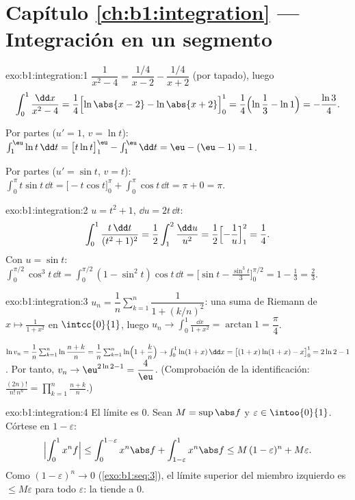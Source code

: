 \section*{Capítulo \ref{ch:b1:integration} --- Integración en un segmento}

\begin{solution}{exo:b1:integration:1}
$\dfrac{1}{x^2-4} = \dfrac{1/4}{x - 2} - \dfrac{1/4}{x+2}$
(por tapado), luego
\[
\int_0^1 \frac{\dd x}{x^2 - 4}
= \frac14\Bigl[\ln\abs{x-2} - \ln\abs{x+2}\Bigr]_0^1
= \frac14\Bigl(\ln\frac{1}{3} - \ln 1\Bigr) = -\frac{\ln 3}{4}.
\]

Por partes ($u' = 1$, $v = \ln t$): $\int_1^{\eu} \ln t\,\dd t =
\bigl[t\ln t\bigr]_1^{\eu} - \int_1^{\eu} \dd t = \eu - (\eu - 1) =
1$.

Por partes ($u' = \sin t$, $v = t$): $\int_0^\pi t\sin t\,\dd t =
\bigl[-t\cos t\bigr]_0^\pi + \int_0^\pi \cos t\,\dd t = \pi + 0 =
\pi$.
\end{solution}

\begin{solution}{exo:b1:integration:2}
 $u = t^2 + 1$, $\dd u = 2t\,\dd t$:
\[
\int_0^1 \frac{t\,\dd t}{(t^2+1)^2}
= \frac12 \int_1^2 \frac{\dd u}{u^2}
= \frac12\Bigl[-\frac1u\Bigr]_1^2 = \frac14 .
\]
Con $u = \sin t$: $\int_0^{\pi/2} \cos^3 t\,\dd t = \int_0^{\pi/2}
(1 - \sin^2 t)\cos t\,\dd t = \bigl[\sin t - \frac{\sin^3
t}{3}\bigr]_0^{\pi/2} = 1 - \frac13 = \frac23$.
\end{solution}

\begin{solution}{exo:b1:integration:3}
$u_n = \dfrac1n \sum_{k=1}^{n} \dfrac{1}{1 + (k/n)^2}$: una suma de
Riemann de $x \mapsto \frac{1}{1+x^2}$ en $\intcc{0}{1}$, luego
$u_n \to \int_0^1 \frac{\dd x}{1+x^2} = \arctan 1 = \dfrac\pi4$.

$\ln v_n = \dfrac1n \sum_{k=1}^{n} \ln\dfrac{n+k}{n} = \dfrac 1n
\sum_{k=1}^n \ln\Bigl(1 + \dfrac kn\Bigr) \to \int_0^1 \ln(1+x)\,\dd
x = \bigl[(1+x)\ln(1+x) - x\bigr]_0^1 = 2\ln 2 - 1$. Por tanto,
$v_n \to \eu^{2\ln 2 - 1} = \dfrac 4\eu$. (Comprobación de la
identificación: $\frac{(2n)!}{n!\,n^n} = \prod_{k=1}^{n} \frac{n+k}{n}$.)
\end{solution}

\begin{solution}{exo:b1:integration:4}
El límite es $0$. Sean $M = \sup \abs f$ y
$\varepsilon \in \intoo{0}{1}$. Córtese en $1 - \varepsilon$:
\[
\Bigl| \int_0^1 x^n f \Bigr|
\leq \int_0^{1 - \varepsilon} x^n \abs f + \int_{1-\varepsilon}^1
x^n \abs f
\leq M\,(1-\varepsilon)^n + M\varepsilon .
\]
Como $(1 - \varepsilon)^n \to 0$ (\cref{exo:b1:seq:3}), el límite
superior del miembro izquierdo es $\leq M\varepsilon$ para todo
$\varepsilon$: la  tiende a $0$.
\end{solution}

